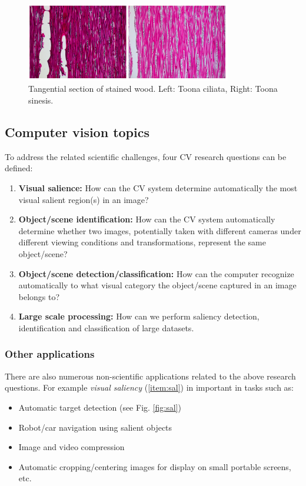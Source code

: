 \begin{figure}[H]
\begin{center}
\includegraphics[width=0.8\textwidth]{fig/treeid}
\end{center}
\caption{Tangential section of stained wood. Left: Toona ciliata, Right: Toona sinesis.}
\label{fig:treeid}
\end{figure}

\subsection{Computer vision topics} 
To address the related scientific challenges, four  CV research questions can be defined:
\begin{enumerate}
\item {\bf Visual salience:} How can the CV system determine automatically the most visual salient region(s) in an image?\label{item:sal}
\item {\bf Object/scene identification:} How can the CV system automatically determine whether two images, potentially taken with different cameras under different viewing conditions and transformations, represent the same object/scene?\label{item:ident}
\item {\bf Object/scene detection/classification:} How can the computer recognize automatically to what visual category the object/scene captured in an image belongs to? \label{item:und}
\item{\bf Large scale processing:} How can we perform saliency detection, identification and classification of large datasets.
\end{enumerate}

\pagebreak

\subsubsection{Other applications}
There are also numerous non-scientific applications related to the above research questions.  For example {\em visual saliency} (\ref{item:sal}) in important in tasks such as:
\begin{itemize}
\item Automatic target detection (see Fig. \ref{fig:sal})
\item Robot/car navigation using salient objects
\item Image and video compression
\item Automatic cropping/centering images for display on small portable screens, etc.
\end{itemize}


